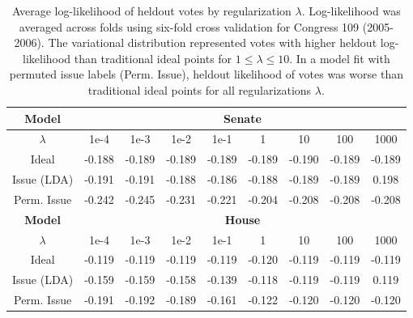 \begin{table}
  \caption{Average log-likelihood of heldout votes by regularization
    $\lambda$. Log-likelihood was averaged across folds using six-fold
    cross validation for Congress 109 (2005-2006).  The variational
    distribution represented votes with higher heldout log-likelihood
    than traditional ideal points for $1 \le \lambda \le 10$. In a
    model fit with permuted issue labels (Perm. Issue), heldout
    likelihood of votes was worse than traditional ideal points for
    all regularizations $\lambda$.
  } \center
  \begin{tabular}{|c|cccccccc|}
    \hline
    \textbf{Model} & \multicolumn{8}{|c|}{\textbf{Senate}} \\
    \hline
    \textbf{$\lambda$}
    & 1e-4
    &  1e-3 
    &  1e-2 
    &  1e-1 
    &  1 
    &  10 
    &  100
    &  1000  \\
    \hline
    Ideal
    &  -0.188 %
    &  -0.189 
    &  -0.189 %
    &  -0.189
    &  -0.189 %
    &  -0.190 %
    &  -0.189
    &  -0.189  \\ %
    Issue (LDA)
    & -0.191 %
    & -0.191
    & -0.188 %
    & -0.186 %
    & -0.188 %
    & -0.189
    & -0.189 %
    & 0.198 \\ 
     Perm. Issue 
    &  -0.242 
    &  -0.245 
    &  -0.231 
    &  -0.221 
    &  -0.204 
    &  -0.208 
    &  -0.208 
    &  -0.208  \\
    \hline
    \hline
    \textbf{Model} & \multicolumn{8}{|c|}{\textbf{House}} \\
    \hline
    \textbf{$\lambda$}
    & 1e-4
    &  1e-3 
    &  1e-2 
    &  1e-1 
    &  1 
    &  10 
    &  100
    &  1000  \\
    \hline
    Ideal
    &  -0.119 %
    &  -0.119 
    &  -0.119 %
    &  -0.119
    &  -0.120 %
    &  -0.119 %
    &  -0.119
    &  -0.119  \\ %
    Issue (LDA)
    & -0.159 %
    & -0.159
    & -0.158 %
    & -0.139 %
    & -0.118 %
    & -0.119
    & -0.119 %
    & 0.119 \\ 
     Perm. Issue 
    &  -0.191 
    &  -0.192 
    &  -0.189 
    &  -0.161 
    &  -0.122 
    &  -0.120 
    &  -0.120 
    &  -0.120  \\
    \hline
  \end{tabular}
  \normalsize
  \label{table:lambda_comparison}
\end{table}

